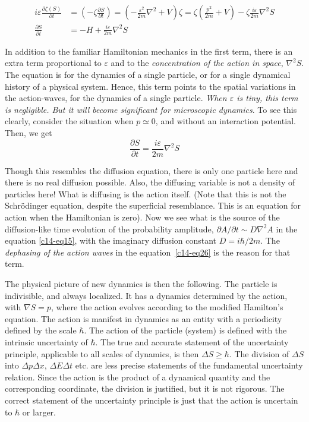 {\fontsize{9}{9}\selectfont\begin{align*}
i \varepsilon \frac{\partial \zeta (S)}{\partial t} & = \left(-\zeta \frac{\partial S}{\partial t} \right) = \left(-\frac{\varepsilon^2}{2m} \nabla^2 + V \right) \zeta = \zeta \left(\frac{p^2}{2m}  + V\right) - \zeta \frac{i\varepsilon}{2m} \nabla^2 S \tag{24}\label{c14-eq24}\\
\frac{\partial S}{\partial t} & = - H + \frac{i \varepsilon}{2m} \nabla^2 S\tag{25}\label{c14-eq25} 
\end{align*}}

In addition to the familiar Hamiltonian mechanics in the first term, there is an extra
term proportional to $\varepsilon$ and to the \textit{concentration of the action in space}, $\nabla^2 S$. The equation
is for the dynamics of a single particle, or for a single dynamical history of a physical system. Hence, this term points to the spatial
variations in the action-waves, for the dynamics of a single particle. \textit{When $\varepsilon$ is
tiny, this term is negligible. But it will become significant for microscopic dynamics}. To see
this clearly, consider the situation when $p \simeq 0$, and without an interaction potential. Then, we get
\begin{equation*}
\frac{\partial S}{\partial t} = \frac{i\varepsilon}{2m} \nabla^2 S \tag{26}\label{c14-eq26}
\end{equation*}

Though this resembles the diffusion equation, there is only one particle here and there is no
real diffusion possible. Also, the diffusing variable is not a density of particles here! What
is diffusing is the action itself. (Note that this is not the Schr\"{o}dinger equation, despite
the superficial resemblance. This is an equation for action when the Hamiltonian is zero). Now we see what
is the source of the diffusion-like time evolution of the probability amplitude,
$\partial A/\partial t\sim D \nabla^2 A$ in the equation \ref{c14-eq15}, with the imaginary diffusion constant $D = i \hbar /2m$. 
The \textit{dephasing of the action waves} in the equation~\ref{c14-eq26} is the reason for that term.

The physical picture of new dynamics is then the following. The particle is indivisible,
and always localized. It has a dynamics determined by the action, with $\nabla S = p$, where
the action evolves according to the modified Hamilton's equation. The action is manifest in
dynamics as an entity with a periodicity defined by the scale $\hbar$. The action of the particle
(system) is defined with the intrinsic uncertainty of $\hbar$. The true and accurate statement of
the uncertainty principle, applicable to all scales of dynamics, is then $\Delta S  \geq \hbar$. The division
of $\Delta S$ into $\Delta p \Delta x$, $\Delta E \Delta t$ etc. are less precise statements of the fundamental uncertainty relation.
Since the action is the product of a dynamical quantity and the corresponding coordinate,
the division is justified, but it is not rigorous. The correct statement of the uncertainty
principle is just that the action is uncertain to $\hbar$ or larger.

